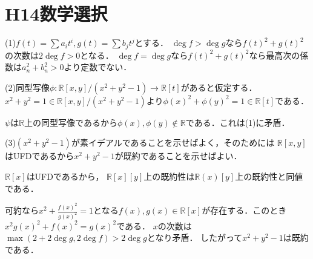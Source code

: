 \documentclass[
		book,
		head_space=20mm,
		foot_space=20mm,
		gutter=10mm,
		line_length=190mm
]{jlreq}
\begin{document}
\section{H14数学選択}
(1)$f(t)=\sum a_i t^i,g(t)=\sum b_j t^j$とする．
$\deg f > \deg g$なら$f(t)^2+g(t)^2$の次数は$2\deg f>0$となる．
$\deg f=\deg g$なら$f(t)^2+g(t)^2$なら最高次の係数は$a_n^2+b_n^2>0$より定数でない．

(2)同型写像$\phi: \mathbb{R}[x,y]/(x^2+y^2-1)\rightarrow \mathbb{R}[t]$があると仮定する．
$x^2+y^2=1\in \mathbb{R}[x,y]/(x^2+y^2-1)$より$\phi(x)^2+\phi(y)^2=1\in \mathbb{R}[t]$である．

$\psi$は$\mathbb{R}$上の同型写像であるから$\phi(x),\phi(y)\notin \mathbb{R}$である．これは(1)に矛盾．

(3)$(x^2+y^2-1)$が素イデアルであることを示せばよく，そのためには
$\mathbb{R}[x,y]$はUFDであるから$x^2+y^2-1$が既約であることを示せばよい．

$\mathbb{R}[x]$はUFDであるから，
$\mathbb{R}[x][y]$上の既約性は$\mathbb{R}(x)[y]$上の既約性と同値である．

可約なら$x^2+\frac{f(x)^2}{g(x)^2}=1$となる$f(x),g(x)\in \mathbb{R}[x]$が存在する．このとき$x^2 g(x)^2+f(x)^2=g(x)^2$である．
$x$の次数は$\max (2+2\deg g,2\deg f)>2 \deg g$となり矛盾．
したがって$x^2+y^2-1$は既約である．
\end{document}
